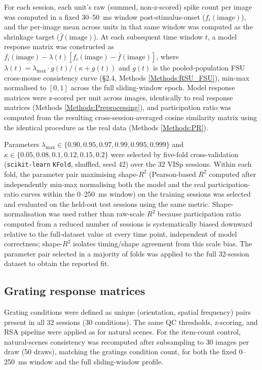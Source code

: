 \documentclass[11pt,onecolumn]{article}
\begin{document}
For each session, each unit's raw (summed, non-z-scored) spike count per
image was computed in a fixed 30--50~ms window post-stimulus-onset
($f_i(\mathrm{image})$), and the per-image mean across units in that same
window was computed as the shrinkage target
($\bar{f}(\mathrm{image})$). At each subsequent time window $t$, a model
response matrix was constructed as $f_i(\mathrm{image}) -
\lambda(t)[f_i(\mathrm{image}) - \bar{f}(\mathrm{image})]$, where
$\lambda(t) = \lambda_\mathrm{max} \cdot g(t) / (\kappa + g(t))$ and $g(t)$
is the pooled-population FSU cross-mouse consistency curve (\S2.4,
Methods \ref{Methods:RSU_FSU}), min-max normalised to $[0,1]$ across the
full sliding-window epoch. Model response matrices were z-scored per unit
across images, identically to real response matrices (Methods
\ref{Methods:Preprocessing}), and participation ratio was computed from the
resulting cross-session-averaged cosine similarity matrix using the
identical procedure as the real data (Methods \ref{Methods:PR}).

Parameters $\lambda_\mathrm{max} \in \{0.90, 0.95, 0.97, 0.99, 0.995,
0.999\}$ and $\kappa \in \{0.05, 0.08, 0.1, 0.12, 0.15, 0.2\}$ were
selected by five-fold cross-validation (\texttt{scikit-learn}
\texttt{KFold}, shuffled, seed 42) over the 32 VISp sessions. Within each
fold, the parameter pair maximising shape-$R^2$ (Pearson-based $R^2$
computed after independently min-max normalising both the model and the
real participation-ratio curves within the 0--250~ms window) on the
training sessions was selected and evaluated on the held-out test
sessions using the same metric. Shape-normalisation was used rather than
raw-scale $R^2$ because participation ratio computed from a reduced number
of sessions is systematically biased downward relative to the full-dataset
value at every time point, independent of model correctness; shape-$R^2$
isolates timing/shape agreement from this scale bias. The parameter pair
selected in a majority of folds was applied to the full 32-session dataset
to obtain the reported fit.

\subsection{Grating response matrices}
\label{Methods:Grating}

Grating conditions were defined as unique (orientation, spatial
frequency) pairs present in all 32 sessions (30 conditions). The same QC
thresholds, z-scoring, and RSA pipeline were applied as for natural
scenes. For the item-count control, natural-scenes consistency was
recomputed after subsampling to 30 images per draw (50 draws), matching
the gratings condition count, for both the fixed 0--250~ms window and the
full sliding-window profile.
\end{document}
